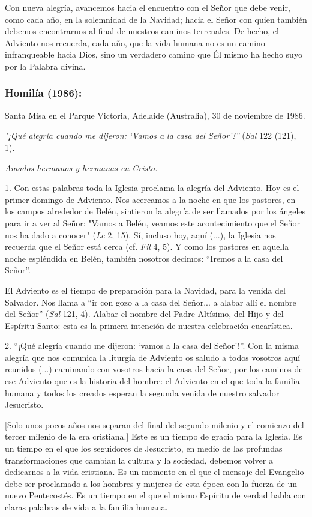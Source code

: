 Con nueva alegría, avancemos hacia el encuentro con el Señor que debe
venir, como cada año, en la solemnidad de la Navidad; hacia el Señor con
quien también debemos encontrarnos al final de nuestros caminos
terrenales. De hecho, el Adviento nos recuerda, cada año, que la vida
humana no es un camino infranqueable hacia Dios, sino un verdadero
camino que Él mismo ha hecho suyo por la Palabra divina.

\subsubsection{Homilía (1986): }

Santa Misa en el Parque Victoria, Adelaide (Australia), 30 de noviembre
de 1986.

\emph{"¡Qué alegría cuando me dijeron: `Vamos a la casa del Señor'!''}
(\emph{Sal} 122 (121), 1).

\emph{Amados hermanos y hermanas en Cristo.}

1. Con estas palabras toda la Iglesia proclama la alegría del Adviento.
Hoy es el primer domingo de Adviento. Nos acercamos a la noche en que
los pastores, en los campos alrededor de Belén, sintieron la alegría de
ser llamados por los ángeles para ir a ver al Señor: "Vamos a Belén,
veamos este acontecimiento que el Señor nos ha dado a conocer"
(\emph{Lc} 2, 15). Sí, incluso hoy, aquí (...), la Iglesia nos recuerda
que el Señor está cerca (cf. \emph{Fil} 4, 5). Y como los pastores en
aquella noche espléndida en Belén, también nosotros decimos: ``Iremos a
la casa del Señor''.

El Adviento es el tiempo de preparación para la Navidad, para la venida
del Salvador. Nos llama a ``ir con gozo a la casa del Señor... a alabar
allí el nombre del Señor'' (\emph{Sal} 121, 4). Alabar el nombre del
Padre Altísimo, del Hijo y del Espíritu Santo: esta es la primera
intención de nuestra celebración eucarística.

2. ``¡Qué alegría cuando me dijeron: `vamos a la casa del Señor'!''. Con
la misma alegría que nos comunica la liturgia de Adviento os saludo a
todos vosotros aquí reunidos (...) caminando con vosotros hacia la casa
del Señor, por los caminos de ese Adviento que es la historia del
hombre: el Adviento en el que toda la familia humana y todos los creados
esperan la segunda venida de nuestro salvador Jesucristo.

{[}Solo unos pocos años nos separan del final del segundo milenio y el
comienzo del tercer milenio de la era cristiana.{]} Este es un tiempo de
gracia para la Iglesia. Es un tiempo en el que los seguidores de
Jesucristo, en medio de las profundas transformaciones que cambian la
cultura y la sociedad, debemos volver a dedicarnos a la vida cristiana.
Es un momento en el que el mensaje del Evangelio debe ser proclamado a
los hombres y mujeres de esta época con la fuerza de un nuevo
Pentecostés. Es un tiempo en el que el mismo Espíritu de verdad habla
con claras palabras de vida a la familia humana.

